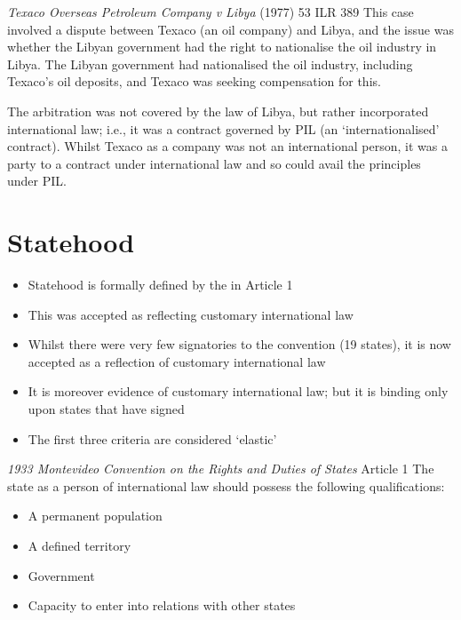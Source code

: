 \begin{casedetails}{\textit{Texaco Overseas Petroleum Company v Libya} (1977) 53 ILR 389}
    \flushleft
    This case involved a dispute between Texaco (an oil company) and Libya, and the issue was whether the Libyan government had the right to nationalise the oil industry in Libya. The Libyan government had nationalised the oil industry, including Texaco's oil deposits, and Texaco was seeking compensation for this.

    \vspace{\baselineskip}

    The arbitration was not covered by the law of Libya, but rather incorporated international law; i.e., it was a contract governed by PIL (an `internationalised' contract). Whilst Texaco as a company was not an international person, it was a party to a contract under international law and so could avail the principles under PIL.
\end{casedetails}

\section{Statehood}
\begin{itemize}
    \item Statehood is formally defined by the  in Article 1
    \item This was accepted as reflecting customary international law
    \item Whilst there were very few signatories to the convention (19 states), it is now accepted as a reflection of customary international law
    \item It is moreover evidence of customary international law; but it is binding only upon states that have signed 
    \item The first three criteria are considered `elastic'
\end{itemize}

\begin{conventiondetails}{\textit{1933 Montevideo Convention on the Rights and Duties of States} Article 1}
    \flushleft
    The state as a person of international law should possess the following qualifications:
    \begin{itemize}
        \item A permanent population
        \item A defined territory
        \item Government
        \item Capacity to enter into relations with other states
    \end{itemize}
\end{conventiondetails}

